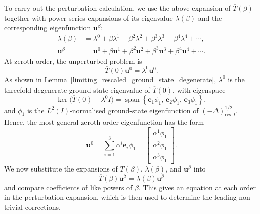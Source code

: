 \documentclass[preprint,12pt]{elsarticle}
\newcommand{\fvect}[1]{\mathbf{#1}}
\begin{document}
To carry out the perturbation calculation, we use the above expansion
of $\overline{T}(\beta)$ together with power-series expansions of its
eigenvalue $\lambda(\beta)$ and the corresponding eigenfunction
$\fvect{u}^{\beta}$:
\begin{align*}
    \lambda(\beta)
      &=\lambda^0+\beta\lambda^1+\beta^2\lambda^2
        +\beta^3\lambda^3+\beta^4\lambda^4+\cdots,\\
    \fvect{u}^\beta
      &=\fvect{u}^0+\beta\fvect{u}^1
        +\beta^2\fvect{u}^2+\beta^3\fvect{u}^3
        +\beta^4\fvect{u}^4+\cdots.
\end{align*}
At zeroth order, the unperturbed problem is
\[
    \overline{T}(0)\fvect{u}^0
    =
    \lambda^0\fvect{u}^0.
\]
As shown in Lemma~\ref{limiting_rescaled_ground_state_degenerate},
$\lambda^0$ is the threefold degenerate ground-state eigenvalue of
$\overline{T}(0)$, with eigenspace
\[
    \ker\bigl(\overline{T}(0)-\lambda^0I\bigr)
    =
    \operatorname{span}\left\{
        \fvect{e}_1\phi_1,\,
        \fvect{e}_2\phi_1,\,
        \fvect{e}_3\phi_1
    \right\},
\]
and $\phi_1$ is the $L^2(I)$-normalised ground-state eigenfunction of
$(-\Delta)^{1/2}_{\mathrm{res},I}$. Hence, the most general zeroth-order
eigenfunction has the form
\[
    \fvect{u}^0
    =
    \sum_{i=1}^3\alpha^i\fvect{e}_i\phi_1
    =
    \begin{bmatrix}
        \alpha^1\phi_1\\
        \alpha^2\phi_1\\
        \alpha^3\phi_1
    \end{bmatrix}.
\]
We now substitute the expansions of $\overline{T}(\beta)$,
$\lambda(\beta)$, and $\fvect{u}^{\beta}$ into
\[
    \overline{T}(\beta)\fvect{u}^{\beta}
    =
    \lambda(\beta)\fvect{u}^{\beta}
\]
and compare coefficients of like powers of $\beta$. This gives an
equation at each order in the perturbation expansion, which is then used
to determine the leading non-trivial corrections.
\end{document}

